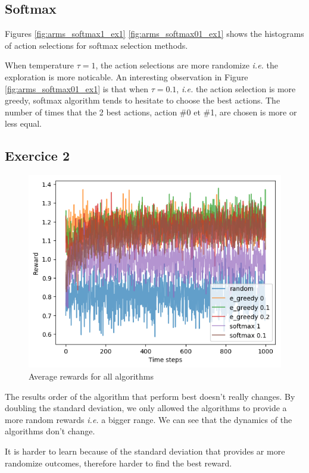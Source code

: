 \documentclass[letterpaper]{article}
\begin{document}
\subsection*{Softmax}


Figures \ref{fig:arms_softmax1_ex1} \ref{fig:arms_softmax01_ex1}
shows the histograms of action selections
for softmax selection methods.

When temperature $\tau = 1$, the action selections are more randomize
\textit{i.e.} the exploration is more noticable. An interesting observation
in Figure \ref{fig:arms_softmax01_ex1}
is that when $\tau = 0.1$, \textit{i.e.}
the action selection is more greedy, softmax
algorithm tends to hesitate to choose the best actions. The
number of times that the 2 best actions,
action \#0 et \#1, are chosen is more or less equal.


\subsection{Exercice 2}

\begin{figure}[H]
    \centering
    \includegraphics[width=.7\linewidth]{images/assign3/ex2/rewards}
    \caption{Average rewards for all algorithms}
    \label{fig:rewards_ex2}
\end{figure}

The results order of the algorithm that perform best doesn't really changes.
By doubling the standard deviation, we only allowed the algorithms to
provide a more random rewards \textit{i.e.} a bigger range. We can see
that the dynamics of the algorithms don't change.


It is harder to learn because of the standard deviation that provides
ar more randomize outcomes, therefore harder to find the best reward.
\end{document}
